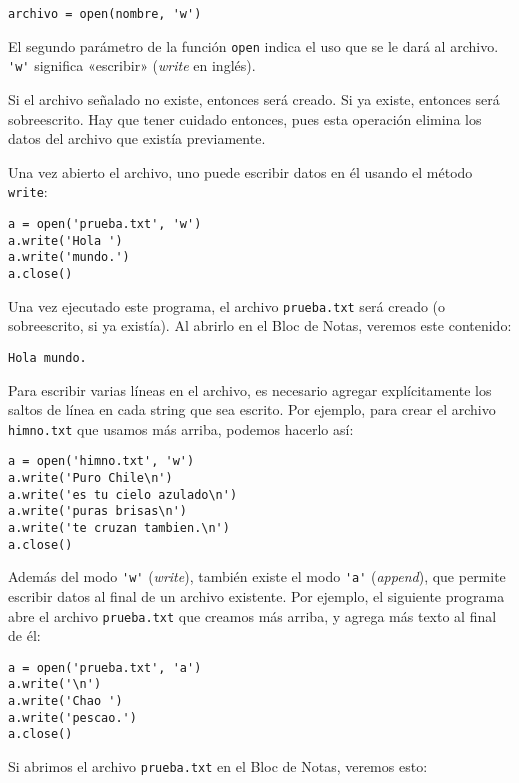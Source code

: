 \begin{lstlisting}
archivo = open(nombre, 'w')
\end{lstlisting}

El segundo parámetro de la función \lstinline!open! indica el uso que se
le dará al archivo. \lstinline!'w'! significa «escribir» (\emph{write}
en inglés).

Si el archivo señalado no existe, entonces será creado. Si ya existe,
entonces será sobreescrito. Hay que tener cuidado entonces, pues esta
operación elimina los datos del archivo que existía previamente.

Una vez abierto el archivo, uno puede escribir datos en él usando el
método \lstinline!write!:

\begin{lstlisting}
a = open('prueba.txt', 'w')
a.write('Hola ')
a.write('mundo.')
a.close()
\end{lstlisting}

Una vez ejecutado este programa, el archivo \lstinline!prueba.txt! será
creado (o sobreescrito, si ya existía). Al abrirlo en el Bloc de Notas,
veremos este contenido:

\begin{lstlisting}[language=file]
Hola mundo.
\end{lstlisting}

Para escribir varias líneas en el archivo, es necesario agregar
explícitamente los saltos de línea en cada string que sea escrito. Por
ejemplo, para crear el archivo \lstinline!himno.txt! que usamos más
arriba, podemos hacerlo así:

\begin{lstlisting}
a = open('himno.txt', 'w')
a.write('Puro Chile\n')
a.write('es tu cielo azulado\n')
a.write('puras brisas\n')
a.write('te cruzan tambien.\n')
a.close()
\end{lstlisting}

Además del modo \lstinline!'w'! (\emph{write}), también existe el modo
\lstinline!'a'! (\emph{append}), que permite escribir datos al final de
un archivo existente. Por ejemplo, el siguiente programa abre el archivo
\lstinline!prueba.txt! que creamos más arriba, y agrega más texto al
final de él:

\begin{lstlisting}
a = open('prueba.txt', 'a')
a.write('\n')
a.write('Chao ')
a.write('pescao.')
a.close()
\end{lstlisting}

Si abrimos el archivo \lstinline!prueba.txt! en el Bloc de Notas,
veremos esto:

